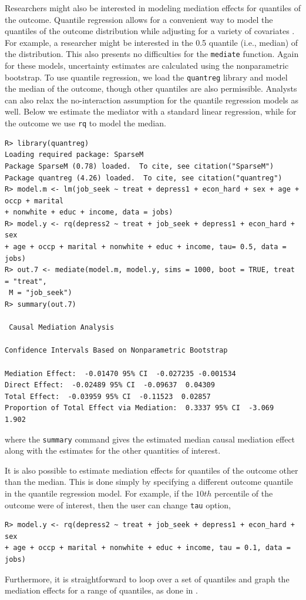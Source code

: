 \documentclass[11pt,letterpaper]{article}
\theoremstyle{plain}
\begin{document}
Researchers might also be interested in modeling mediation effects for
quantiles of the outcome.  Quantile regression allows for a convenient
way to model the quantiles of the outcome distribution while adjusting
for a variety of covariates \citep{Koenker:2005}.  For example, a
researcher might be interested in the 0.5 quantile (i.e., median)
of the distribution. This also presents no difficulties for the
\texttt{mediate} function.  Again for these models, uncertainty
estimates are calculated using the nonparametric bootstrap.  To use
quantile regression, we load the \texttt{quantreg} library and model
the median of the outcome, though other quantiles are also
permissible.  Analysts can also relax the no-interaction assumption
for the quantile regression models as well.  Below we estimate the
mediator with a standard linear regression, while for the outcome we
use \texttt{rq} to model the median.
\begin{verbatim}
R> library(quantreg)
Loading required package: SparseM
Package SparseM (0.78) loaded.  To cite, see citation("SparseM")
Package quantreg (4.26) loaded.  To cite, see citation("quantreg")
R> model.m <- lm(job_seek ~ treat + depress1 + econ_hard + sex + age + occp + marital
+ nonwhite + educ + income, data = jobs)
R> model.y <- rq(depress2 ~ treat + job_seek + depress1 + econ_hard + sex
+ age + occp + marital + nonwhite + educ + income, tau= 0.5, data = jobs)
R> out.7 <- mediate(model.m, model.y, sims = 1000, boot = TRUE, treat = "treat",
 M = "job_seek")
R> summary(out.7)

 Causal Mediation Analysis

Confidence Intervals Based on Nonparametric Bootstrap

Mediation Effect:  -0.01470 95% CI  -0.027235 -0.001534
Direct Effect:  -0.02489 95% CI  -0.09637  0.04309
Total Effect:  -0.03959 95% CI  -0.11523  0.02857
Proportion of Total Effect via Mediation:  0.3337 95% CI  -3.069  1.902
\end{verbatim}
where the {\tt summary} command gives the estimated median causal
mediation effect along with the estimates for the other quantities of
interest.

It is also possible to estimate mediation effects for quantiles of the
outcome other than the median. This is done simply by specifying a
different outcome quantile in the quantile regression model. For
example, if the $10th$ percentile of the outcome were of interest,
then the user can change {\tt tau} option,
\begin{verbatim}
R> model.y <- rq(depress2 ~ treat + job_seek + depress1 + econ_hard + sex
+ age + occp + marital + nonwhite + educ + income, tau = 0.1, data = jobs)
\end{verbatim}
Furthermore, it is straightforward to loop over a set of quantiles and
graph the mediation effects for a range of quantiles, as done in
\citet{imai:keel:ting:10}.
\end{document}
